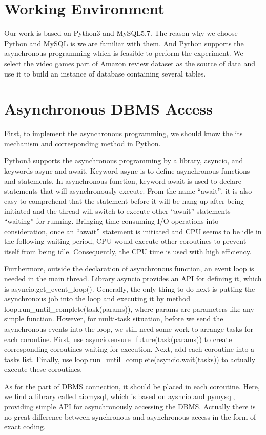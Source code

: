 \documentclass[onecolumn, conference, 12pt]{IEEEtran}
\begin{document}
	\section{Working Environment}
	Our work is based on Python3 and MySQL5.7. The reason why we choose Python and MySQL is we are familiar with them. And Python supports the asynchronous programming which is feasible to perform the experiment. We select the video games part of Amazon review dataset as the source of data and use it to build an instance of database containing several tables.

	\section{Asynchronous DBMS Access}
	First, to implement the asynchronous programming, we should know the its mechanism and corresponding method in Python. 

	Python3 supports the asynchronous programming by a library, asyncio, and keywords async and await. Keyword async is to define asynchronous functions and statements. In asynchronous function, keyword await is used to declare statements that will asynchronously execute. From the name ``await'', it is also easy to comprehend that the statement before it will be hang up after being initiated and the thread will switch to execute other ``await'' statements ``waiting'' for running. Bringing time-consuming I/O operations into consideration, once an ``await'' statement is initiated and CPU seems to be idle in the following waiting period, CPU would execute other coroutines to prevent itself from being idle. Consequently, the CPU time is used with high efficiency. 

	Furthermore, outside the declaration of asynchronous function, an event loop is needed in the main thread. Library asyncio provides an API for defining it, which is asyncio.get\_event\_loop(). Generally, the only thing to do next is putting the asynchronous job into the loop and executing it by method loop.run\_until\_complete(task(params)), where params are parameters like any simple function. However, for multi-task situation, before we send the asynchronous events into the loop, we still need some work to arrange tasks for each coroutine. First, use asyncio.ensure\_future(task(params)) to create corresponding coroutines waiting for execution. Next, add each coroutine into a tasks list. Finally, use loop.run\_until\_complete(asyncio.wait(tasks)) to actually execute these coroutines.

	As for the part of DBMS connection, it should be placed in each coroutine. Here, we find a library called aiomysql, which is based on aysncio and pymysql, providing simple API for asynchronously accessing the DBMS. Actually there is no great difference between synchronous and asynchronous access in the form of exact coding. 
\end{document}
